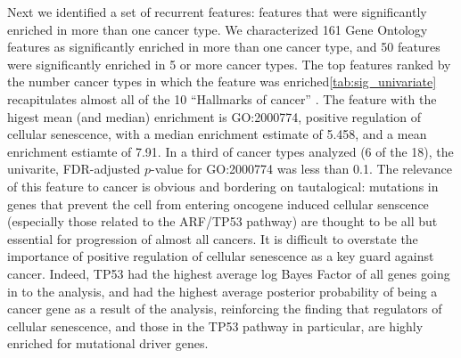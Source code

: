Next we identified a set of recurrent features: features that were significantly enriched in more than one cancer type.  We characterized 161 Gene Ontology features as significantly enriched in more than one cancer type, and 50
features were significantly enriched in 5 or more cancer types.  The top features ranked by the number cancer types in which the feature was enriched\ref{tab:sig_univariate} recapitulates almost all of the 10 ``Hallmarks of cancer''
\cite{Hanahan_2011}.  The feature with the higest mean (and median) enrichment is GO:2000774, positive regulation of cellular senescence, with a median enrichment estimate of 5.458, and a mean enrichment estiamte of 7.91.  In a third of cancer types analyzed (6 of the 18), the univarite, FDR-adjusted $p$-value for GO:2000774 was less than 0.1.  The relevance of this feature to cancer is obvious and bordering on tautalogical: mutations in genes that prevent the cell from entering oncogene induced cellular senscence (especially those related to the ARF/TP53 pathway) are thought to be all but essential for progression of almost all cancers\cite{chandeck10_oncog_induc_cellul_senes}.  It is difficult to overstate the importance of positive regulation of cellular senescence as a key guard against cancer.  Indeed, TP53 had the highest average log Bayes Factor of all genes going in to the analysis, and had the highest average posterior probability of being a cancer gene as a result of the analysis, reinforcing the finding that regulators of cellular senescence, and those in the TP53 pathway in particular, are highly enriched for mutational driver genes.

